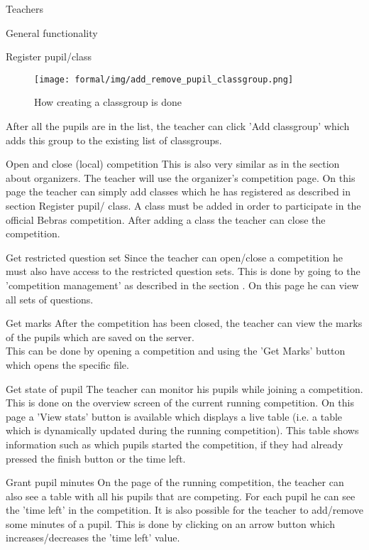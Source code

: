 \begin{section}{Teachers}
\begin{subsection}{General functionality}
\begin{subsubsection}{Register pupil/class}
	\begin{figure}[!h]
			  \centering
				\texttt{[image: formal/img/add\_remove\_pupil\_classgroup.png]}
			  \caption{How creating a classgroup is done}
			  \label{create_classgroup}
			\end{figure}
	After all the pupils are in the list, the teacher can click 'Add classgroup' which adds this group to the existing list
	of classgroups. 
	\end{subsubsection}
	\begin{subsubsection}{Open and close (local) competition}
	This is also very similar as in the section about organizers. The teacher will use the organizer's competition page.
	On this page the teacher can simply add classes which he has registered as described in section Register pupil/ class.
	A class must be added in order to participate in the official Bebras competition. After adding a class the teacher can
	close the competition.\\
	\end{subsubsection}
	\begin{subsubsection}{Get restricted question set}
	Since the teacher can open/close a competition he must also have access to the restricted question sets. This is done by going
	to the 'competition management' as described in the section . On this page he can view all sets of questions.
	\end{subsubsection}
	\begin{subsubsection}{Get marks}
	After the competition has been closed, the teacher can view the marks of the pupils which are saved on the server.\\
	This can be done by opening a competition and using the 'Get Marks' button which opens the specific file.
	\end{subsubsection}
	\begin{subsubsection}{Get state of pupil}
	The teacher can monitor his pupils while joining a competition. This is done on the overview screen of 		the current running competition. On this page a 'View stats' button is available which displays a live table 
	(i.e. a table which is dynamically updated during the running competition). This table shows information such as which pupils started the competition, if they had already pressed the finish button or the time left. 
	\end{subsubsection}
	\begin{subsubsection}{Grant pupil minutes}
	On the page of the running competition, the teacher can also see a table with all his pupils that are competing. For each pupil he can see the 'time left' in the competition. It is also 		possible for the teacher to add/remove some minutes of a pupil. This is done by clicking on an arrow button which increases/decreases the 'time left' value.

\end{subsubsection}
\end{subsection}
\end{section}
